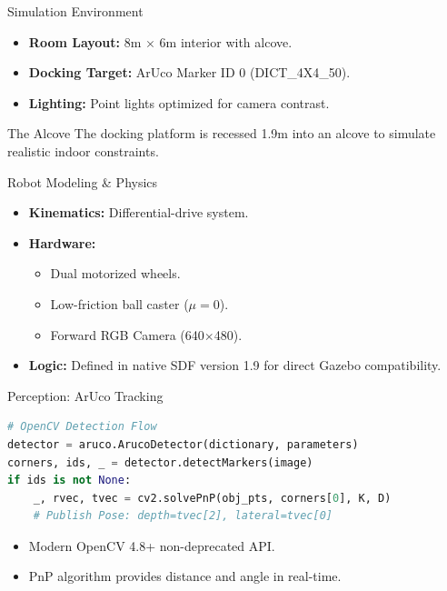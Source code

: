 \documentclass{beamer}
\begin{document}
\begin{frame}{Simulation Environment}
    \begin{itemize}
        \item \textbf{Room Layout:} 8m $\times$ 6m interior with alcove.
        \item \textbf{Docking Target:} ArUco Marker ID 0 (DICT\_4X4\_50).
        \item \textbf{Lighting:} Point lights optimized for camera contrast.
    \end{itemize}
    \begin{block}{The Alcove}
        The docking platform is recessed 1.9m into an alcove to simulate realistic indoor constraints.
    \end{block}
\end{frame}

\begin{frame}{Robot Modeling \& Physics}
    \begin{itemize}
        \item \textbf{Kinematics:} Differential-drive system.
        \item \textbf{Hardware:}
            \begin{itemize}
                \item Dual motorized wheels.
                \item Low-friction ball caster ($\mu = 0$).
                \item Forward RGB Camera (640$\times$480).
            \end{itemize}
        \item \textbf{Logic:} Defined in native SDF version 1.9 for direct Gazebo compatibility.
    \end{itemize}
\end{frame}

\begin{frame}[fragile]{Perception: ArUco Tracking}
\begin{lstlisting}[language=Python]
# OpenCV Detection Flow
detector = aruco.ArucoDetector(dictionary, parameters)
corners, ids, _ = detector.detectMarkers(image)
if ids is not None:
    _, rvec, tvec = cv2.solvePnP(obj_pts, corners[0], K, D)
    # Publish Pose: depth=tvec[2], lateral=tvec[0]
\end{lstlisting}
\begin{itemize}
    \item Modern OpenCV 4.8+ non-deprecated API.
    \item PnP algorithm provides distance and angle in real-time.
\end{itemize}
\end{frame}
\end{document}
